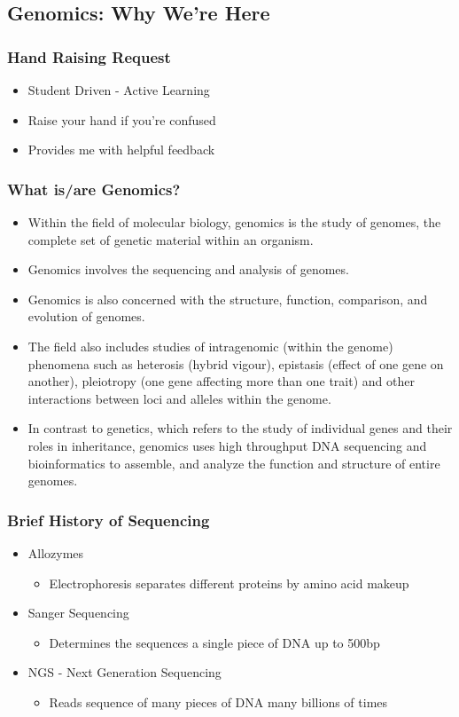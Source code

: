 \documentclass[14pt]{beamer}
\begin{document}
\subsection{Genomics: Why We're Here}
\begin{frame}
\frametitle{Hand Raising Request}
\begin{itemize}
	\item<1-> Student Driven - Active Learning
	\item<2-> Raise your hand if you're confused
	\item<3-> Provides me with helpful feedback
\end{itemize}
%
\end{frame}
\begin{frame}
\frametitle{What is/are Genomics?}
\footnotesize
\begin{itemize}
	\item<2-> Within the field of molecular biology, genomics is the study of genomes, the complete set of genetic material within an organism.
	\item<3-> Genomics involves the sequencing and analysis of genomes. 
	\item<4-> Genomics is also concerned with the structure, function, comparison, and evolution of genomes.
	\item<5-> The field also includes studies of intragenomic (within the genome) phenomena such as heterosis (hybrid vigour), epistasis (effect of one gene on another), pleiotropy (one gene affecting more than one trait) and other interactions between loci and alleles within the genome.
	\item<6-> In contrast to genetics, which refers to the study of individual genes and their roles in inheritance, genomics uses high throughput DNA sequencing and bioinformatics to assemble, and analyze the function and structure of entire genomes.
\end{itemize}
\normalsize
\end{frame}
\begin{frame}
\frametitle{Brief History of Sequencing}
\begin{itemize}
	\item Allozymes
	\begin{itemize}
		\item Electrophoresis separates different proteins by amino acid makeup
	\end{itemize}
	\item Sanger Sequencing
	\begin{itemize}
		\item Determines the sequences a single piece of DNA up to 500bp
	\end{itemize}
	\item NGS - Next Generation Sequencing
	\begin{itemize}
		\item Reads sequence of many pieces of DNA many billions of times
	\end{itemize}
\end{itemize}
\end{frame}
\end{document}

